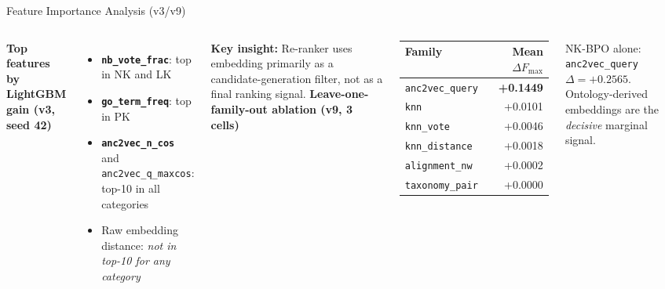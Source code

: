 \documentclass[12pt, aspectratio=169]{beamer}
\newcommand{\highlight}[1]{\textcolor{proteagreen}{\textbf{#1}}}
\begin{document}
\begin{frame}{Feature Importance Analysis (v3/v9)}
  \begin{columns}[t]
      \textbf{Top features by LightGBM gain (v3, seed 42)}
      \begin{itemize}
        \item \highlight{\texttt{nb\_vote\_frac}}: top in NK and LK
        \item \highlight{\texttt{go\_term\_freq}}: top in PK
        \item \highlight{\texttt{anc2vec\_n\_cos}} and \texttt{anc2vec\_q\_maxcos}: top-10 in all categories
        \item Raw embedding distance: \emph{not in top-10 for any category}
      \end{itemize}
      \vspace{0.5em}
      \textbf{Key insight:} Re-ranker uses embedding primarily as a candidate-generation
      filter, not as a final ranking signal.
      \textbf{Leave-one-family-out ablation (v9, 3 cells)}
      \vspace{0.3em}
      \begin{tabular}{lr}
        \toprule
        Family & Mean $\Delta F_{\max}$ \\
        \midrule
        \texttt{anc2vec\_query} & \highlight{+0.1449} \\
        \texttt{knn} & +0.0101 \\
        \texttt{knn\_vote} & +0.0046 \\
        \texttt{knn\_distance} & +0.0018 \\
        \texttt{alignment\_nw} & +0.0002 \\
        \texttt{taxonomy\_pair} & +0.0000 \\
        \bottomrule
      \end{tabular}
      \vspace{0.3em}
      {\small NK-BPO alone: \texttt{anc2vec\_query} $\Delta = +0.2565$.}
      Ontology-derived embeddings are the \emph{decisive} marginal signal.
  \end{columns}
\end{frame}
\end{document}
